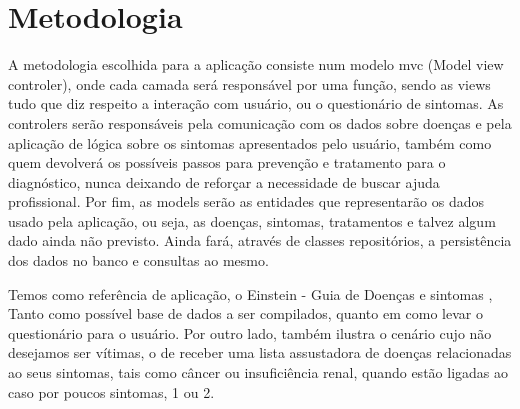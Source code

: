 \section{Metodologia}

A metodologia escolhida para a aplicação consiste num modelo mvc (Model view controler), onde cada camada será responsável por uma função, sendo as views tudo que diz respeito a interação com usuário, ou o questionário de sintomas. As controlers serão responsáveis pela comunicação com os dados sobre doenças e pela aplicação de lógica sobre os sintomas apresentados pelo usuário, também como quem devolverá os possíveis passos para prevenção e tratamento para o diagnóstico, nunca deixando de reforçar a necessidade de buscar ajuda profissional.
Por fim, as models serão as entidades que representarão os dados usado pela aplicação, ou seja, as doenças, sintomas, tratamentos e talvez algum dado ainda não previsto. Ainda fará, através de classes repositórios, a persistência dos dados no banco e consultas ao mesmo.


Temos como referência de aplicação, o Einstein - Guia de Doenças e sintomas \cite{https://www.einstein.br/guia-doencas-sintomas}, Tanto como possível base de dados a ser compilados, quanto em como levar o questionário para o usuário. Por outro lado, também ilustra o cenário cujo não desejamos ser vítimas, o de receber uma lista assustadora de doenças relacionadas ao seus sintomas, tais como câncer ou insuficiência renal, quando estão ligadas ao caso por poucos sintomas, 1 ou 2.


